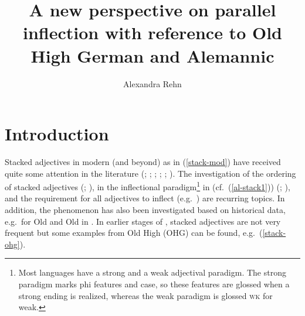 \documentclass[output=paper,colorlinks,citecolor=brown]{langscibook}
\author{Alexandra Rehn\orcid{}\affiliation{University of Konstanz}}
\title[Parallel inflection in Old High German and Alemannic]{A new perspective on parallel inflection with reference to Old High German and Alemannic}
\begin{document}
\maketitle



\section{Introduction}\label{sect:intro}

Stacked adjectives in modern  (and beyond) as in (\ref{stack-mod}) have received quite some attention in the literature (\citealp{Bildhauer2019}; \citealp{eichinger1991ganz}; \citealp{MunzbergBildhauer2020}; \citealp{olsen1991deutsche}; \citealp{Roehrs2009}; \citealp{Scott2002}).
The investigation of the ordering of stacked adjectives (\citealp{eichinger1991ganz}; \citealp{Scott2002}),  
 in the inflectional paradigm\footnote{Most  languages have a strong and a weak adjectival paradigm. The strong paradigm marks phi features and case, so these features are glossed when a strong ending is realized, whereas the weak paradigm is glossed \textsc{wk} for weak.} in  (cf.~(\ref{al-stack1})) (\citealp{Bildhauer2019}; \citealp{Roehrs2009}), and the requirement for all adjectives to inflect (e.g.~\citealp{olsen1991deutsche}) are recurring topics. In addition, the phenomenon has also been investigated based on historical data, e.g.~for Old  and Old  in \citet{Bech17}. In earlier stages of , stacked adjectives are not very frequent but some examples from Old High  (OHG) can be found, e.g.~(\ref{stack-ohg}).

\ea \label{stack}
\z 
\z
\end{document}
